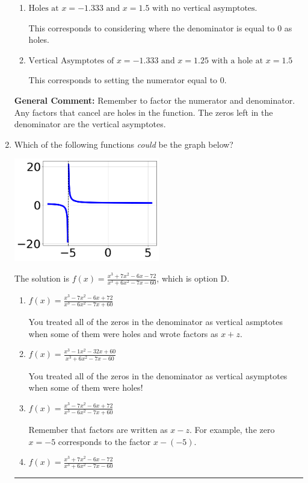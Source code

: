\documentclass{extbook}[14pt]
\newcommand{\litem}[1]{\item #1

\rule{\textwidth}{0.4pt}}
\begin{document}
\begin{enumerate}
{\begin{enumerate}[label=\Alph*.]
This corresponds to not factoring out the hole.
\item \( \text{Holes at } x = -1.333 \text{ and } x = 1.5 \text{ with no vertical asymptotes.} \)

This corresponds to considering where the denominator is equal to 0 as holes.
\item \( \text{Vertical Asymptotes of } x = -1.333 \text{ and } x = 1.25 \text{ with a hole at } x = 1.5 \)

This corresponds to setting the numerator equal to 0.
\end{enumerate}

\textbf{General Comment:} Remember to factor the numerator and denominator. Any factors that cancel are holes in the function. The zeros left in the denominator are the vertical asymptotes.
}
\litem{
Which of the following functions \textit{could} be the graph below?

\begin{center}
    \includegraphics[width=0.5\textwidth]{../Figures/identifyGraphOfRationalFunctionCopyB.png}
\end{center}


The solution is \( f(x)=\frac{x^{3} +7 x^{2} -6 x -72}{x^{3} +6 x^{2} -7 x -60} \), which is option D.\begin{enumerate}[label=\Alph*.]
\item \( f(x)=\frac{x^{3} -7 x^{2} -6 x + 72}{x^{3} -6 x^{2} -7 x + 60} \)

You treated all of the zeros in the denominator as vertical asmptotes when some of them were holes and wrote factors as $x+z$.
\item \( f(x)=\frac{x^{3} -1 x^{2} -32 x + 60}{x^{3} +6 x^{2} -7 x -60} \)

You treated all of the zeros in the denominator as vertical asymptotes when some of them were holes!
\item \( f(x)=\frac{x^{3} -7 x^{2} -6 x + 72}{x^{3} -6 x^{2} -7 x + 60} \)

Remember that factors are written as $x-z$. For example, the zero $x=-5$ corresponds to the factor $x-(-5)$.
\item \( f(x)=\frac{x^{3} +7 x^{2} -6 x -72}{x^{3} +6 x^{2} -7 x -60} \)


\end{enumerate}}
\end{enumerate}
\end{document}

